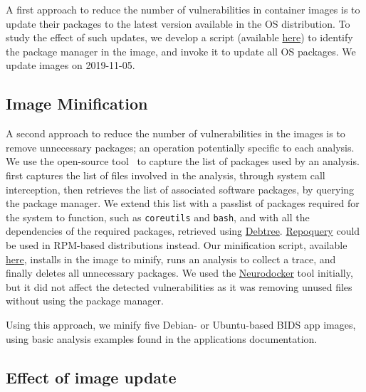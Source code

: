 A first approach to reduce the number of vulnerabilities in container
images is to update their packages to the latest version available in the OS
distribution. To study the effect of such updates, we develop a script
(available
\href{https://github.com/big-data-lab-team/container-vulnerabilities-paper/blob/master/Scripts/update}{here})
to identify the package manager in the image, and invoke it to update all
OS packages. We update images on 2019-11-05.

\subsection{Image Minification}

A second approach to reduce the number of vulnerabilities in the images is
to remove unnecessary packages; an operation potentially specific to each
analysis. We use the open-source \reprozip tool~\cite{rampin2016reprozip}
to capture the list of packages used by an analysis. \reprozip first
captures the list of files involved in the analysis, through system call
interception, then retrieves the list of associated software packages, by
querying the package manager. We extend this list with a passlist of
packages required for the system to function, such as \texttt{coreutils}
and \texttt{bash}, and with all the dependencies of the required packages,
retrieved using
\href{http://manpages.ubuntu.com/manpages/xenial/man1/debtree.1.html}{Debtree}.
\href{https://linux.die.net/man/1/repoquery}{Repoquery} could be used in
RPM-based distributions instead. Our minification script, available
\href{https://github.com/big-data-lab-team/container-vulnerabilities-paper/tree/master/Scripts/minification}{here},
installs \reprozip in the image to minify, runs an analysis to collect a
\reprozip trace, and finally deletes all unnecessary packages. We used
the \href{https://github.com/ReproNim/neurodocker}{Neurodocker} tool
initially, but it did not affect the detected vulnerabilities
as it was removing unused files without using the package manager.

Using this approach, we minify five Debian- or Ubuntu-based BIDS app images,
using basic analysis examples found in the applications documentation.

\subsection{Effect of image update}

